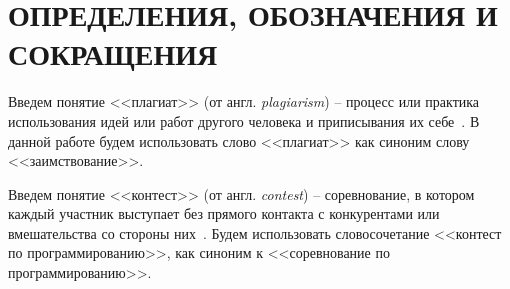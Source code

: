 \section*{ОПРЕДЕЛЕНИЯ, ОБОЗНАЧЕНИЯ И СОКРАЩЕНИЯ}

Введем понятие <<плагиат>> (от англ. \textit{plagiarism}) --  процесс или практика использования идей или работ другого человека и приписывания их себе~\cite{plagiat}. В данной работе будем использовать слово <<плагиат>> как синоним слову <<заимствование>>.

Введем понятие <<контест>> (от англ. \textit{contest}) --  соревнование, в котором каждый участник выступает без прямого контакта с конкурентами или вмешательства со стороны них~\cite{contest}. Будем использовать словосочетание <<контест по программированию>>, как синоним к <<соревнование по программированию>>.

\pagebreak